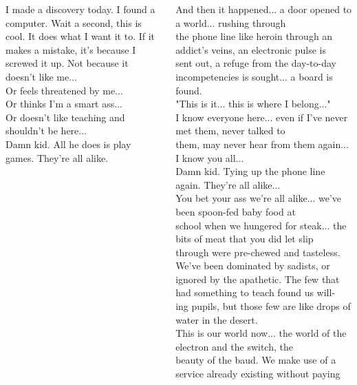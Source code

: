 \documentclass[aspectratio=169]{beamer}
\begin{document}
\begin{frame}
\begin{columns}
\begin{center}
    \smallskip
    I made a discovery today.  I found a computer.  Wait a second, this is\\
    cool.  It does what I want it to.  If it makes a mistake, it's because I\\
    screwed it up.  Not because it doesn't like me...\\
    Or feels threatened by me...\\
    Or thinks I'm a smart ass...\\
    Or doesn't like teaching and shouldn't be here...\\
    Damn kid.  All he does is play games.  They're all alike.\\
    \end{center}
    \endgroup
    \begingroup
    \fontsize{4pt}{4pt}\selectfont
    \begin{center}
    And then it happened... a door opened to a world... rushing through\\
    the phone line like heroin through an addict's veins, an electronic pulse is\\
    sent out, a refuge from the day-to-day incompetencies is sought... a board is\\
    found.\\
    "This is it... this is where I belong..."\\
    I know everyone here... even if I've never met them, never talked to\\
    them, may never hear from them again... I know you all...\\
    Damn kid.  Tying up the phone line again.  They're all alike...\\
    \smallskip
    You bet your ass we're all alike... we've been spoon-fed baby food at\\
    school when we hungered for steak... the bits of meat that you did let slip\\
    through were pre-chewed and tasteless.  We've been dominated by sadists, or\\
    ignored by the apathetic.  The few that had something to teach found us will-\\
    ing pupils, but those few are like drops of water in the desert.\\
    \smallskip
    This is our world now... the world of the electron and the switch, the\\
    beauty of the baud.  We make use of a service already existing without paying\\

\end{center}
\end{columns}
\end{frame}
\end{document}
